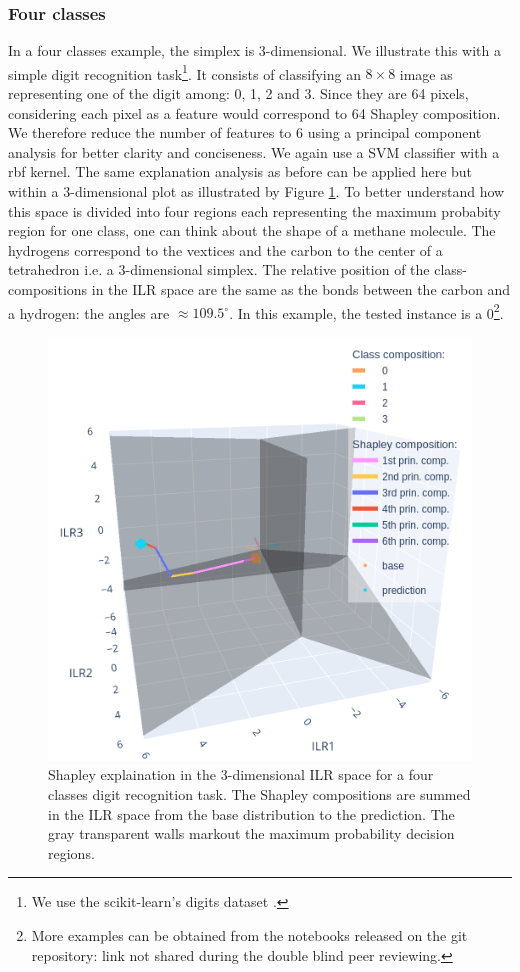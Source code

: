 \documentclass{article}
\theoremstyle{plain}
\theoremstyle{definition}
\theoremstyle{remark}
\begin{document}
\subsubsection{Four classes}

In a four classes example, the simplex is $3$-dimensional. We illustrate this with a simple digit recognition task\footnote{We use the scikit-learn's digits dataset \cite{pedregosa2011scikit}.}. It consists of classifying an $8\times8$ image as representing one of the digit among: 0, 1, 2 and 3. Since they are 64 pixels, considering each pixel as a feature would correspond to 64 Shapley composition. We therefore reduce the number of features to 6 using a principal component analysis for better clarity and conciseness. We again use a SVM classifier with a rbf kernel. The same explanation analysis as before can be applied here but within a $3$-dimensional plot as illustrated by Figure \ref{fig:4classesshapsum}. To better understand how this space is divided into four regions each representing the maximum probabity region for one class, one can think about the shape of a methane molecule. The hydrogens correspond to the vextices and the carbon to the center of a tetrahedron i.e. a $3$-dimensional simplex. The relative position of the class-compositions in the ILR space are the same as the bonds between the carbon and a hydrogen: the angles are $\approx 109.5^{\circ}$. In this example, the tested instance is a 0\footnote{More examples can be obtained from the notebooks released on the git repository: link not shared during the double blind peer reviewing.}.
\begin{figure}
  \centering
  \includegraphics[width=0.9\linewidth]{figures/4classes/ilrplotsum.png}
  \caption{Shapley explaination in the $3$-dimensional ILR space for a four classes digit recognition task. The Shapley compositions are summed in the ILR space from the base distribution to the prediction. The gray transparent walls markout the maximum probability decision regions.}
  \label{fig:4classesshapsum}
\end{figure}
\end{document}

